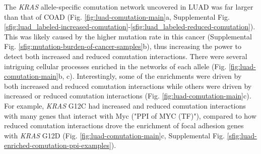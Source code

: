 \documentclass[english, 12pt, letterpaper]{article}
\newcommand{\KRAS}{\emph{KRAS}}
\begin{document}

The \KRAS{} allele-specific comutation network uncovered in LUAD was far larger than that of COAD (Fig. \ref{fig:luad-comutation-main}a, Supplemental Fig. \ref{sfig:luad_labeled-increased-comutation}-\ref{sfig:luad_labeled-reduced-comutation}).
This was likely caused by the higher mutation rate in this cancer (Supplemental Fig. \ref{sfig:mutation-burden-of-cancer-samples}b), thus increasing the power to detect both increased and reduced comutation interactions.
There were several intriguing cellular processes enriched in the networks of each allele (Fig. \ref{fig:luad-comutation-main}b, c).
Interestingly, some of the enrichments were driven by both increased and reduced comutation interactions while others were driven by increased or reduced comutation interactions (Fig. \ref{fig:luad-comutation-main}c).
For example, \KRAS{} G12C had increased and reduced comutation interactions with many genes that interact with Myc ("PPI of MYC (TF)"), compared to how reduced comutation interactions drove the enrichment of focal adhesion genes with \KRAS{} G12D (Fig. \ref{fig:luad-comutation-main}c, Supplemental Fig. \ref{sfig:luad-enriched-comutation-ppi-examples}).
\end{document}
